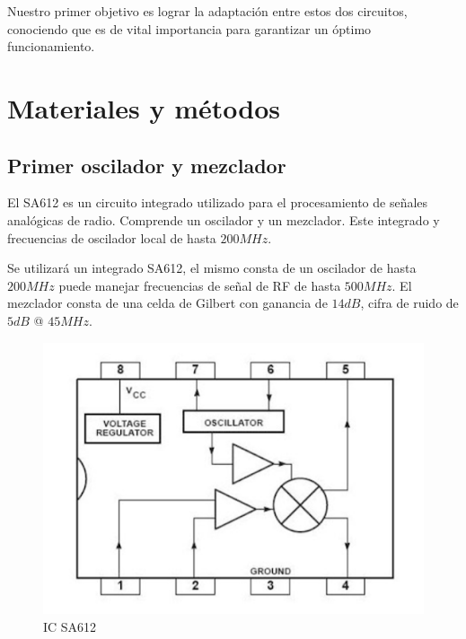 \documentclass{article}
\newcommand{\comment}[1]{}
\begin{document}
Nuestro primer objetivo es lograr la adaptación entre estos dos circuitos, conociendo que es de vital importancia para garantizar un óptimo funcionamiento.
 
\section{Materiales y métodos}

\comment { %
\subsection{Front-End; \textbf{no sé si dejar esta subsección}}
El filtro de RF permitirá la atenuación de la primer frecuencia imagen que afectará al receptor superheterodino. 
\begin{center}
$f_o = 100MHz$ , $Bw = 100KHz$
\end{center}
}%

\subsection{Primer oscilador y mezclador}
El SA612 es un circuito integrado utilizado para el procesamiento
de señales analógicas de radio. Comprende un oscilador y un mezclador. Este integrado y
frecuencias de oscilador local de hasta $200 MHz$.

Se utilizará un integrado SA612, el mismo consta de un oscilador de hasta $200MHz$ puede manejar frecuencias de señal de RF de hasta $500 MHz$. El mezclador consta de una celda de Gilbert con ganancia de $14 dB$, cifra de ruido de $5dB$ @ $45MHz$.

\begin{figure}[H]
  \centering
    \includegraphics[scale=0.55]{SA612}
  \caption{IC SA612}
\end{figure}
\end{document}
